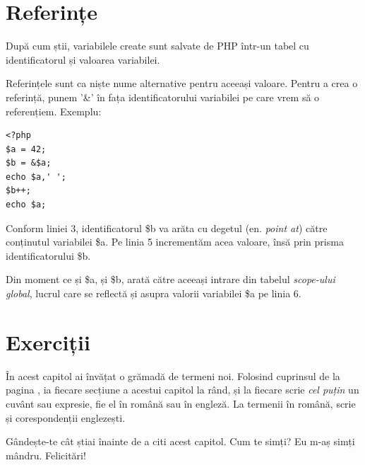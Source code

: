 \section{Referințe}
După cum știi, variabilele create sunt salvate de PHP într-un tabel cu identificatorul
și valoarea variabilei.

Referințele sunt ca niște nume alternative pentru aceeași valoare. Pentru a crea o referință,
punem '\&' în fața identificatorului variabilei pe care vrem să o referențiem. Exemplu:

\begin{lstlisting}
<?php
$a = 42;
$b = &$a;
echo $a,' ';
$b++;
echo $a;
\end{lstlisting}
Conform liniei 3, identificatorul \$b va {\glqq}arăta cu degetul{\grqq} (en. \textsl{point at})
către conținutul variabilei \$a. Pe linia 5 incrementăm acea valoare, însă prin prisma
identificatorului \$b.

Din moment ce și \$a, și \$b, arată către aceeași intrare din tabelul
\textit{\textit{scope}-ului global}, lucrul care
se reflectă și asupra valorii variabilei \$a pe linia 6.

\section{Exerciții}

\begin{Exercise}[title={Terminologie},difficulty=1]
În acest capitol ai învățat o grămadă de termeni noi.
Folosind cuprinsul de la pagina \pageref{cuprins},
ia fiecare secțiune a acestui capitol la rând, și la fiecare
scrie \textit{cel puțin} un cuvânt sau expresie,
fie el în română sau în engleză. La termenii în română,
scrie și corespondenții englezești.

Gândește-te cât știai înainte de a citi acest
capitol. Cum te simți? Eu m-aș simți mândru.
Felicitări!
\end{Exercise}

